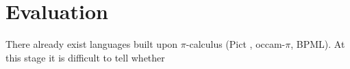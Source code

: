 \section{Evaluation}



There already exist languages built upon $\pi$-calculus (Pict \cite{pt97} \cite{p96}, occam-$\pi$, BPML). At this stage it is difficult to tell whether
